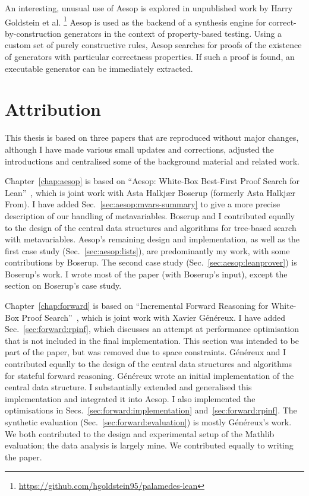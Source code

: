 An interesting, unusual use of Aesop is explored in unpublished work by Harry Goldstein et al.%
\footnote{\url{https://github.com/hgoldstein95/palamedes-lean}}
Aesop is used as the backend of a synthesis engine for correct-by-construction generators in the context of property-based testing.
Using a custom set of purely constructive rules, Aesop searches for proofs of the existence of generators with particular correctness properties.
If such a proof is found, an executable generator can be immediately extracted.

\section{Attribution}

This thesis is based on three papers that are reproduced without major changes, although I have made various small updates and corrections, adjusted the introductions and centralised some of the background material and related work.

Chapter~\ref{chap:aesop} is based on \enquote{Aesop: White-Box Best-First Proof Search for Lean}~\cite{Aesop}, which is joint work with Asta Halkjær Boserup (formerly Asta Halkjær From).
I have added Sec.~\ref{sec:aesop:mvars-summary} to give a more precise description of our handling of metavariables.
Boserup and I contributed equally to the design of the central data structures and algorithms for tree-based search with metavariables.
Aesop's remaining design and implementation, as well as the first case study (Sec.~\ref{sec:aesop:lists}), are predominantly my work, with some contributions by Boserup.
The second case study (Sec.~\ref{sec:aesop:leanprover}) is Boserup's work.
I wrote most of the paper (with Boserup's input), except the section on Boserup's case study.

Chapter~\ref{chap:forward} is based on \enquote{Incremental Forward Reasoning for White-Box Proof Search}~\cite{Aesop-forward}, which is joint work with Xavier Généreux.
I have added Sec.~\ref{sec:forward:rpinf}, which discusses an attempt at performance optimisation that is not included in the final implementation.
This section was intended to be part of the paper, but was removed due to space constraints.
Généreux and I contributed equally to the design of the central data structures and algorithms for stateful forward reasoning.
Généreux wrote an initial implementation of the central data structure.
I substantially extended and generalised this implementation and integrated it into Aesop.
I also implemented the optimisations in Secs.~\ref{sec:forward:implementation} and~\ref{sec:forward:rpinf}.
The synthetic evaluation (Sec.~\ref{sec:forward:evaluation}) is mostly Généreux's work.
We both contributed to the design and experimental setup of the Mathlib evaluation; the data analysis is largely mine.
We contributed equally to writing the paper.

